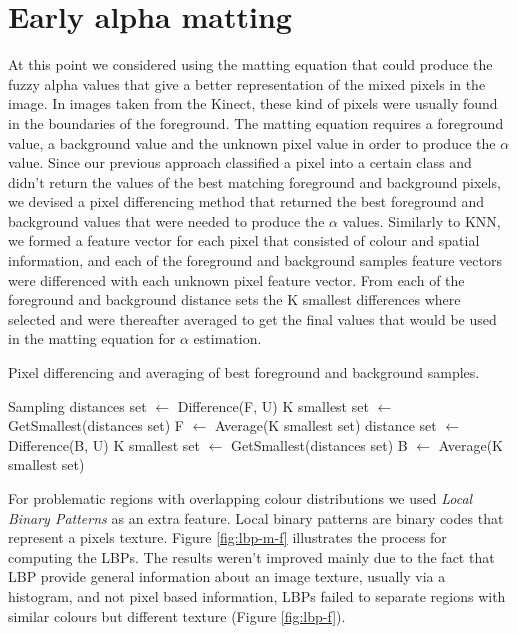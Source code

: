 \section{Early alpha matting}
\label{sec:early-matting}

At this point we considered using the matting equation that could produce the fuzzy alpha values that give a better representation of the mixed pixels in the image. In images taken from the Kinect, these kind of pixels were usually found in the boundaries of the foreground.
The matting equation requires a foreground value, a background value and the unknown pixel value in order to produce the $\alpha$ value. Since our previous approach classified a pixel into a certain class and didn't return the values of the best matching foreground and background pixels, we devised a pixel differencing method that returned the best foreground and background values that were needed to produce the $\alpha$ values.
Similarly to KNN, we formed a feature vector for each pixel that consisted of colour and spatial information, and each of the foreground and background samples feature vectors were differenced with each unknown pixel feature vector. From each of the foreground and background distance sets the K smallest differences where selected and were thereafter averaged to get the final values that would be used in the matting equation for $\alpha$ estimation.

\begin{algorithm}
\caption{Pixel differencing and averaging of best foreground and background samples.}\label{differencing-method}
\begin{algorithmic}[1]
\State Sampling
\State distances set $\gets$ Difference(F, U)
\EndFor
\State K smallest set $\gets$ GetSmallest(distances set)
\State F $\gets$ Average(K smallest set)
\State distance set $\gets$ Difference(B, U)
\EndFor
\State K smallest set $\gets$ GetSmallest(distances set)
\State B $\gets$ Average(K smallest set)
\EndFor
\end{algorithmic}
\end{algorithm}

For problematic regions with overlapping colour distributions we used \textit{Local Binary Patterns} \cite{lbp} as an extra feature. Local binary patterns are binary codes that represent a pixels texture. Figure \ref{fig:lbp-m-f} illustrates the process for computing the LBPs. The results weren’t improved mainly due to the fact that LBP provide general information about an image texture, usually via a histogram, and not pixel based information, LBPs failed to separate regions with similar colours but different texture (Figure \ref{fig:lbp-f}).

